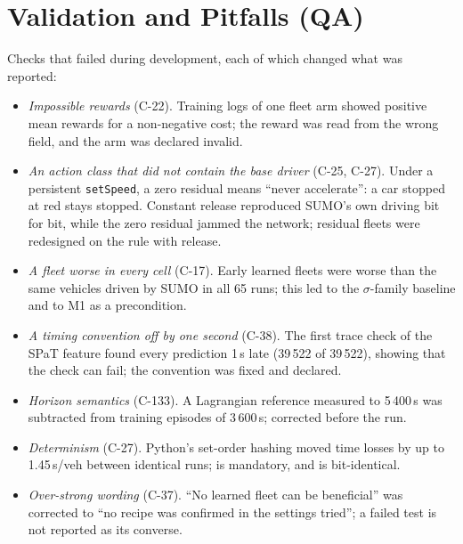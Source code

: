 \section{Validation and Pitfalls (QA)}\label{app:qa}
Checks that failed during development, each of which changed what was reported:
\begin{itemize}\setlength\itemsep{1pt}
\item \emph{Impossible rewards} (C-22). Training logs of one fleet arm showed positive mean rewards for a non-negative cost; the reward was
read from the wrong field, and the arm was declared invalid.
\item \emph{An action class that did not contain the base driver} (C-25, C-27). Under a persistent \texttt{setSpeed}, a zero residual means
``never accelerate'': a car stopped at red stays stopped. Constant release reproduced SUMO's own driving bit for bit, while the zero
residual jammed the network; residual fleets were redesigned on the rule with release.
\item \emph{A fleet worse in every cell} (C-17). Early learned fleets were worse than the same vehicles driven by SUMO in all 65 runs; this
led to the $\sigma$-family baseline and to M1 as a precondition.
\item \emph{A timing convention off by one second} (C-38). The first trace check of the SPaT feature found every prediction 1\,s late
(39\,522 of 39\,522), showing that the check can fail; the convention was fixed and declared.
\item \emph{Horizon semantics} (C-133). A Lagrangian reference measured to 5\,400\,s was subtracted from training episodes of 3\,600\,s;
corrected before the run.
\item \emph{Determinism} (C-27). Python's set-order hashing moved time losses by up to 1.45\,s/veh between identical runs;
 is mandatory, and  is bit-identical.
\item \emph{Over-strong wording} (C-37). ``No learned fleet can be beneficial'' was corrected to ``no recipe was confirmed in the settings
tried''; a failed test is not reported as its converse.
\end{itemize}



